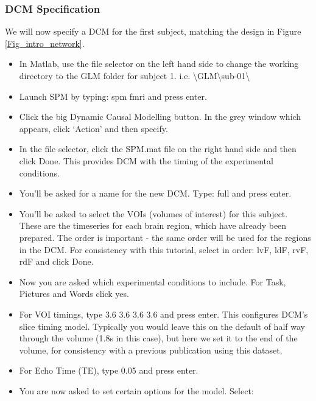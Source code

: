 \documentclass{article}
\begin{document}
\subsubsection{DCM Specification} \label{GUI_specification}
We will now specify a DCM for the first subject, matching the design in Figure \ref{Fig_intro_network}.
\begin{itemize}
    
\item In Matlab, use the file selector on the left hand side to change the working directory to the GLM folder for subject 1. i.e. \textbackslash{GLM}\textbackslash{sub-01}\textbackslash

\item Launch SPM by typing: spm fmri and press enter.

\item Click the big Dynamic Causal Modelling button. In the grey window which appears, click `Action' and then specify.

\item In the file selector, click the SPM.mat file on the right hand side and then click Done. This provides DCM with the timing of the experimental conditions.

\item You'll be asked for a name for the new DCM. Type: full  and press enter.

\item You'll be asked to select the VOIs (volumes of interest) for this subject. These are the timeseries for each brain region, which have already been prepared. The order is important - the same order will be used for the regions in the DCM. For consistency with this tutorial, select in order: lvF, ldF, rvF, rdF and click Done.

\item Now you are asked which experimental conditions to include. For Task, Pictures and Words click yes.

\item For VOI timings, type 3.6  3.6  3.6  3.6 and press enter. This configures DCM's slice timing model. Typically you would leave this on the default of half way through the volume (1.8s in this case), but here we set it to the end of the volume, for consistency with a previous publication using this dataset.

\item For Echo Time (TE), type 0.05 and press enter.

\item You are now asked to set certain options for the model. Select: 


\end{itemize}
\end{document}
